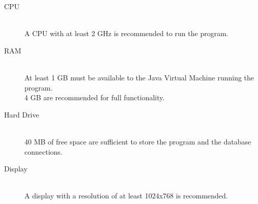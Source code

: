 \begin{description}
	\item[CPU] \hfill \\
	A CPU with at least 2 GHz is recommended to run the program.
	\item[RAM] \hfill \\
	At least 1 GB must be available to the Java Virtual Machine running the program. \\
	4 GB are recommended for full functionality.
	\item[Hard Drive] \hfill \\
	40 MB of free space are sufficient to store the program and the database connections.
	\item[Display] \hfill \\
	A display with a resolution of at least 1024x768 is recommended.
\end{description}
